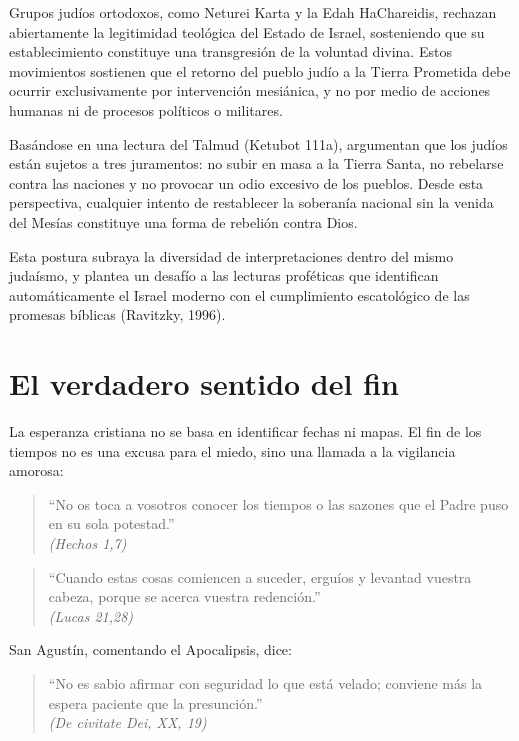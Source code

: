 \documentclass[12pt]{article}
\begin{document}
Grupos judíos ortodoxos, como Neturei Karta y la Edah HaChareidis, rechazan abiertamente la legitimidad teológica del Estado de Israel, sosteniendo que su establecimiento constituye una transgresión de la voluntad divina. Estos movimientos sostienen que el retorno del pueblo judío a la Tierra Prometida debe ocurrir exclusivamente por intervención mesiánica, y no por medio de acciones humanas ni de procesos políticos o militares.

Basándose en una lectura del Talmud (Ketubot 111a), argumentan que los judíos están sujetos a tres juramentos: no subir en masa a la Tierra Santa, no rebelarse contra las naciones y no provocar un odio excesivo de los pueblos. Desde esta perspectiva, cualquier intento de restablecer la soberanía nacional sin la venida del Mesías constituye una forma de rebelión contra Dios.

Esta postura subraya la diversidad de interpretaciones dentro del mismo judaísmo, y plantea un desafío a las lecturas proféticas que identifican automáticamente el Israel moderno con el cumplimiento escatológico de las promesas bíblicas (Ravitzky, 1996).



\section*{El verdadero sentido del fin}
La esperanza cristiana no se basa en identificar fechas ni mapas. El fin de los tiempos no es una excusa para el miedo, sino una llamada a la vigilancia amorosa:

\begin{quote}
“No os toca a vosotros conocer los tiempos o las sazones que el Padre puso en su sola potestad.” \\ \emph{(Hechos 1,7)}
\end{quote}

\begin{quote}
“Cuando estas cosas comiencen a suceder, erguíos y levantad vuestra cabeza, porque se acerca vuestra redención.” \\ \emph{(Lucas 21,28)}
\end{quote}

San Agustín, comentando el Apocalipsis, dice:

\begin{quote}
“No es sabio afirmar con seguridad lo que está velado; conviene más la espera paciente que la presunción.” \\ \emph{(De civitate Dei, XX, 19)}
\end{quote}
\end{document}

